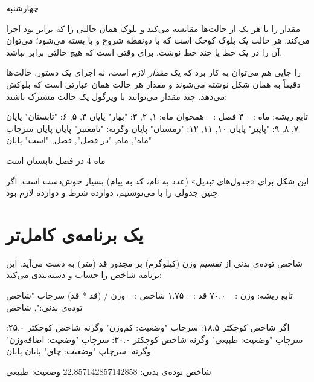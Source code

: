 \begin{outputfa}
چهارشنبه
\end{outputfa}

 مقدار  را با هر یک از حالت‌ها مقایسه می‌کند و
بلوک همان حالتی را که برابر بود اجرا می‌کند. هر حالت یک بلوک کوچک است که
با دونقطه شروع و با  بسته می‌شود؛ می‌توان آن را در یک خط یا
چند خط نوشت.  برای وقتی است که هیچ حالتی برابر نباشد.

 را جایی هم می‌توان به کار برد که یک \emph{مقدار} لازم است،
نه اجرای یک دستور. حالت‌ها دقیقاً به همان شکل نوشته می‌شوند و مقدار هر
حالت همان عبارتی است که بلوکش می‌دهد. چند مقدار می‌توانند با ویرگول یک
حالت مشترک باشند:

\begin{salamfa}
تابع ریشه:
    ماه := ۴
    فصل := همخوان ماه:
        ۱, ۲, ۳: "بهار" پایان
        ۴, ۵, ۶: "تابستان" پایان
        ۷, ۸, ۹: "پاییز" پایان
        ۱۰, ۱۱, ۱۲: "زمستان" پایان
        وگرنه: "نامعتبر" پایان
    پایان
    سرچاپ "ماه", ماه, "در فصل", فصل, "است"
پایان
\end{salamfa}

\begin{outputfa}
ماه 4 در فصل تابستان است
\end{outputfa}

این شکل برای «جدول‌های تبدیل» (عدد به نام، کد به پیام) بسیار خوش‌دست است.
اگر چنین جدولی را با  می‌نوشتیم، دوازده شرط و دوازده
 لازم بود.

\section{یک برنامه‌ی کامل‌تر}

شاخص توده‌ی بدنی از تقسیم وزن (کیلوگرم) بر مجذور قد (متر) به دست می‌آید.
این برنامه شاخص را حساب و دسته‌بندی می‌کند:

\begin{salamfa}
تابع ریشه:
    وزن := ۷۰.۰
    قد := ۱.۷۵
    شاخص := وزن / (قد * قد)
    سرچاپ "شاخص توده‌ی بدنی:", شاخص

    اگر شاخص کوچکتر ۱۸.۵:
        سرچاپ "وضعیت: کم‌وزن"
    وگرنه شاخص کوچکتر ۲۵.۰:
        سرچاپ "وضعیت: طبیعی"
    وگرنه شاخص کوچکتر ۳۰.۰:
        سرچاپ "وضعیت: اضافه‌وزن"
    وگرنه:
        سرچاپ "وضعیت: چاق"
    پایان
پایان
\end{salamfa}

\begin{outputfa}
شاخص توده‌ی بدنی: 22.857142857142858
وضعیت: طبیعی
\end{outputfa}

